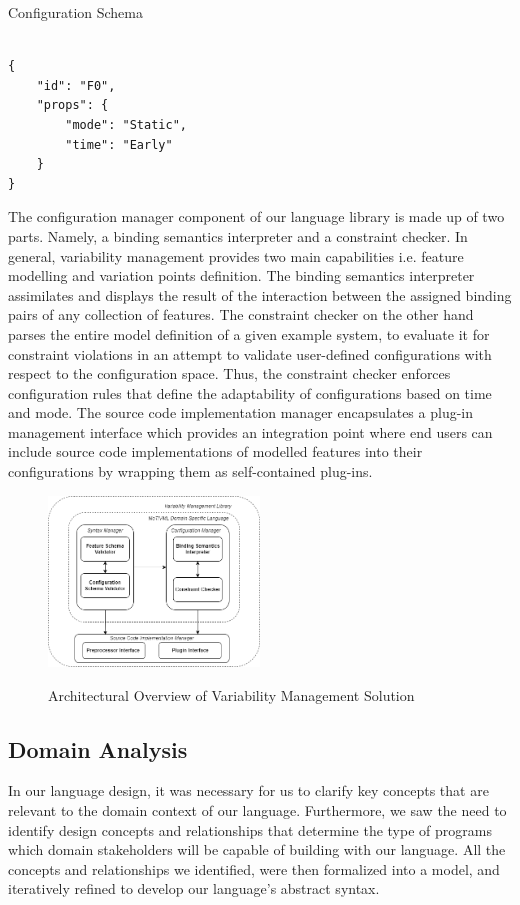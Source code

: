\documentclass[conference]{IEEEtran}
\begin{document}
\begin{listing}[H]
\caption{Configuration Schema}
\begin{verbatim}

{
    "id": "F0",
    "props": {
        "mode": "Static",
        "time": "Early"
    }
}
\end{verbatim}
\label{bind-schema}
\end{listing}

The configuration manager component of our language library is made up of two parts. Namely, a binding semantics interpreter and a constraint checker. In general, variability management provides two main capabilities i.e. feature modelling and variation points definition. The binding semantics interpreter assimilates and displays the result of the interaction between the assigned binding pairs of any collection of features. The constraint checker on the other hand parses the entire model definition of a given example system, to evaluate it for constraint violations in an attempt to validate user-defined configurations with respect to the configuration space. Thus, the constraint checker enforces configuration rules that define the adaptability of configurations based on time and mode.
The source code implementation manager encapsulates a plug-in management interface which provides an integration point where end users can include source code implementations of modelled features into their configurations by wrapping them as self-contained plug-ins.

\begin{figure}[H]
\caption{Architectural Overview of Variability Management Solution}
\centering
\includegraphics[width=0.5\textwidth]{diagrams/arch-overview.png}
\label{arch-over}
\end{figure}

\subsection{Domain Analysis}
In our language design, it was necessary for us to clarify key concepts that are relevant to the domain context of our language. Furthermore, we saw the need to identify design concepts and relationships that determine the type of programs which domain stakeholders will be capable of building with our language. All the concepts and relationships we identified, were then formalized into a model, and iteratively refined to develop our language's abstract syntax.
\end{document}
